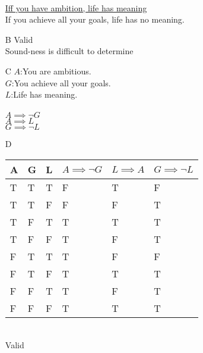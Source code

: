 \documentclass{article}
\begin{document}
\begin{enumerate}
			\\\underline{Iff you have ambition, life has meaning}
			\\If you achieve all your goals, life has no meaning.
		\item[B]
			Valid
			\\Sound-ness is difficult to determine
		\item[C]
			$A$:You are ambitious.\\
			$G$:You achieve all your goals.\\
			$L$:Life has meaning.\\
			\\
			$A \implies \lnot G$\\
			\underline{$A \implies L$}\\
			$G \implies \lnot L$
		\item[D]
			\begin{tabular}{l | l | l || l | l || l}
				A & G & L & $A \implies \lnot G$ & $L \implies A$ & $G \implies \lnot L$\\ \hline
				T & T & T & F & T & F\\
				T & T & F & F & F & T\\
				T & F & T & T & T & T\\
				T & F & F & T & F & T\\
				F & T & T & T & F & F\\
				F & T & F & T & T & T\\
				F & F & T & T & F & T\\
				F & F & F & T & T & T\\
			\end{tabular}
			\\
			Valid
			\\


\end{enumerate}
\end{document}
